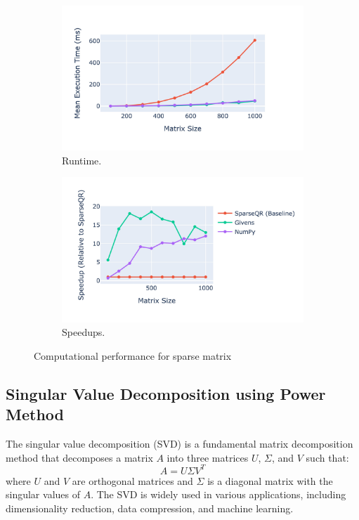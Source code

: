 \documentclass[11pt,a4paper]{article}
\begin{document}
\begin{figure}[H]
    \centering
    \begin{subfigure}[b]{0.48\textwidth}
        \includegraphics[width=\textwidth]{Images/sparseqr_givens.jpg}
        \caption{Runtime.}
    \end{subfigure}
    \begin{subfigure}[b]{0.48\textwidth}
        \includegraphics[width=\textwidth]{Images/speedup_sparseqr_givens.jpg}
        \caption{Speedups.}
    \end{subfigure}
    \caption{Computational performance for sparse matrix}
    \label{fig:qr_performance}
\end{figure}

\subsection{Singular Value Decomposition using Power Method}
The singular value decomposition (SVD) is a fundamental matrix decomposition method that decomposes a matrix $A$ into three matrices $U$, $\Sigma$, and $V$ such that:
\[
    A = U \Sigma V^T
\]
where $U$ and $V$ are orthogonal matrices and $\Sigma$ is a diagonal matrix with the singular values of $A$. The SVD is widely used in various applications, including dimensionality reduction, data compression, and machine learning. 
\end{document}
